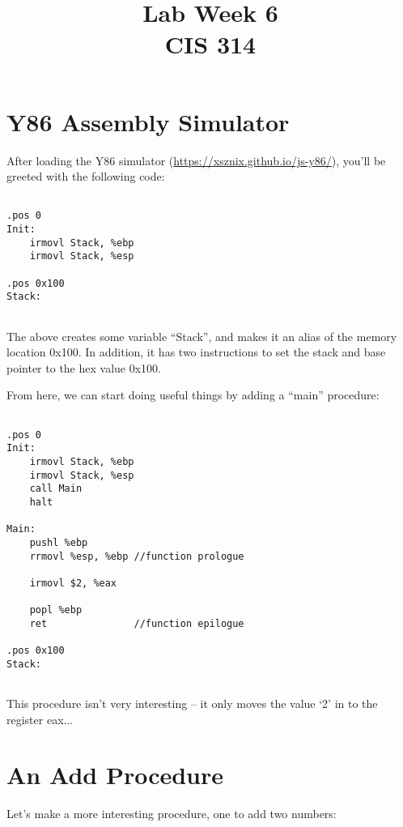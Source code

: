 \documentclass[10pt]{article}
\begin{document}
\title{Lab Week \raisebox{.22ex}{\large\#}6 \\
	CIS 314}
\author{}

\maketitle

\section{Y86 Assembly Simulator}


After loading the Y86 simulator (\url{https://xsznix.github.io/js-y86/}), you'll be greeted with the following code:

\begin{lstlisting}

.pos 0
Init:
    irmovl Stack, %ebp
    irmovl Stack, %esp
    
.pos 0x100
Stack:
    
\end{lstlisting}


The above creates some variable ``Stack'', and makes it an alias of the memory location 0x100. In addition, it has two instructions to set the stack and base pointer to the hex value 0x100.


From here, we can start doing useful things by adding a ``main'' procedure:


\begin{lstlisting}

.pos 0
Init:
    irmovl Stack, %ebp
    irmovl Stack, %esp
    call Main
    halt

Main:
    pushl %ebp
    rrmovl %esp, %ebp //function prologue

    irmovl $2, %eax

    popl %ebp
    ret               //function epilogue
    
.pos 0x100
Stack:
    
\end{lstlisting}

This procedure isn't very interesting -- it only moves the value `2' in to the register eax...


\newpage

\section{An Add Procedure}


Let's make a more interesting procedure, one to add two numbers:
\end{document}
